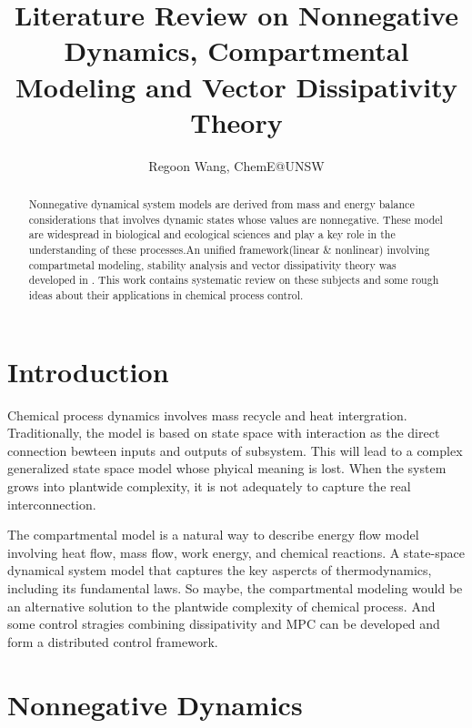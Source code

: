 \documentclass{paper}
\begin{document}
 
\title{Literature Review on Nonnegative Dynamics, Compartmental Modeling and Vector Dissipativity Theory}
\author{Regoon Wang, ChemE@UNSW} 


\maketitle
\begin{abstract}
Nonnegative dynamical system models are derived from mass and energy balance considerations that
involves dynamic states whose values are nonnegative. These model are widespread in biological
and ecological sciences and play a key role in the understanding of these processes.An unified
framework(linear \& nonlinear) involving compartmetal modeling, stability analysis and vector 
dissipativity theory was developed in \cite{bern_comp,hadd_non,hadd_thermo1,hadd_thermo2}. 
This work contains systematic review on these subjects and some rough ideas about their applications
in chemical process control.
\end{abstract} 

\tableofcontents
\section{Introduction}
Chemical process dynamics involves mass recycle and heat intergration. Traditionally, the model is based on state
space with interaction as the direct connection bewteen inputs and outputs of subsystem. This will lead to
a complex generalized state space model whose phyical meaning is lost. When the system grows into plantwide
complexity, it is not adequately to capture the real interconnection.

The compartmental model is a natural way to describe energy flow model involving heat flow, mass flow, work energy, 
and chemical reactions. A state-space dynamical system model that captures the key aspercts of thermodynamics, 
including its fundamental laws. So maybe, the compartmental modeling would be an alternative solution to the
plantwide complexity of chemical process. And some control stragies combining dissipativity and MPC can be
developed and form a distributed control framework.
\section{Nonnegative Dynamics}
\end{document}
